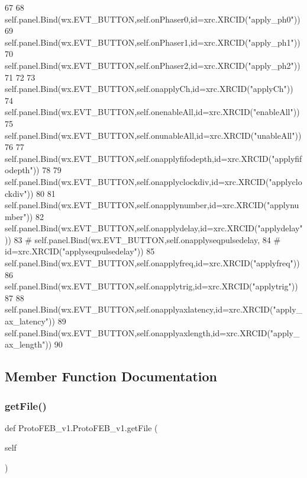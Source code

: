 \begin{DoxyCode}
67 
68         self.panel.Bind(wx.EVT\_BUTTON,self.onPhaser0,id=xrc.XRCID(\textcolor{stringliteral}{"apply\_ph0"}))
69         self.panel.Bind(wx.EVT\_BUTTON,self.onPhaser1,id=xrc.XRCID(\textcolor{stringliteral}{"apply\_ph1"}))
70         self.panel.Bind(wx.EVT\_BUTTON,self.onPhaser2,id=xrc.XRCID(\textcolor{stringliteral}{"apply\_ph2"}))
71 
72 
73         self.panel.Bind(wx.EVT\_BUTTON,self.onapplyCh,id=xrc.XRCID(\textcolor{stringliteral}{"applyCh"}))
74         self.panel.Bind(wx.EVT\_BUTTON,self.onenableAll,id=xrc.XRCID(\textcolor{stringliteral}{"enableAll"}))
75         self.panel.Bind(wx.EVT\_BUTTON,self.onunableAll,id=xrc.XRCID(\textcolor{stringliteral}{"unableAll"}))
76 
77         self.panel.Bind(wx.EVT\_BUTTON,self.onapplyfifodepth,id=xrc.XRCID(\textcolor{stringliteral}{"applyfifodepth"}))
78 
79         self.panel.Bind(wx.EVT\_BUTTON,self.onapplyclockdiv,id=xrc.XRCID(\textcolor{stringliteral}{"applyclockdiv"}))
80 
81         self.panel.Bind(wx.EVT\_BUTTON,self.onapplynumber,id=xrc.XRCID(\textcolor{stringliteral}{"applynumber"}))
82         self.panel.Bind(wx.EVT\_BUTTON,self.onapplydelay,id=xrc.XRCID(\textcolor{stringliteral}{"applydelay"}))
83 \textcolor{comment}{#        self.panel.Bind(wx.EVT\_BUTTON,self.onapplyseqpulsedelay,}
84 \textcolor{comment}{#                        id=xrc.XRCID("applyseqpulsedelay"))}
85         self.panel.Bind(wx.EVT\_BUTTON,self.onapplyfreq,id=xrc.XRCID(\textcolor{stringliteral}{"applyfreq"}))
86         self.panel.Bind(wx.EVT\_BUTTON,self.onapplytrig,id=xrc.XRCID(\textcolor{stringliteral}{"applytrig"}))
87 
88         self.panel.Bind(wx.EVT\_BUTTON,self.onapplyaxlatency,id=xrc.XRCID(\textcolor{stringliteral}{"apply\_ax\_latency"}))
89         self.panel.Bind(wx.EVT\_BUTTON,self.onapplyaxlength,id=xrc.XRCID(\textcolor{stringliteral}{"apply\_ax\_length"}))
90 
\end{DoxyCode}


\subsection{Member Function Documentation}
\mbox{\label{classProtoFEB__v1_1_1ProtoFEB__v1_a1c733a344ce1755bbffeec01dc3c9846}} 
\subsubsection{\texorpdfstring{get\+File()}{getFile()}}
{\footnotesize\ttfamily def Proto\+F\+E\+B\+\_\+v1.\+Proto\+F\+E\+B\+\_\+v1.\+get\+File (\begin{DoxyParamCaption}\item[{}]{self }\end{DoxyParamCaption})}




